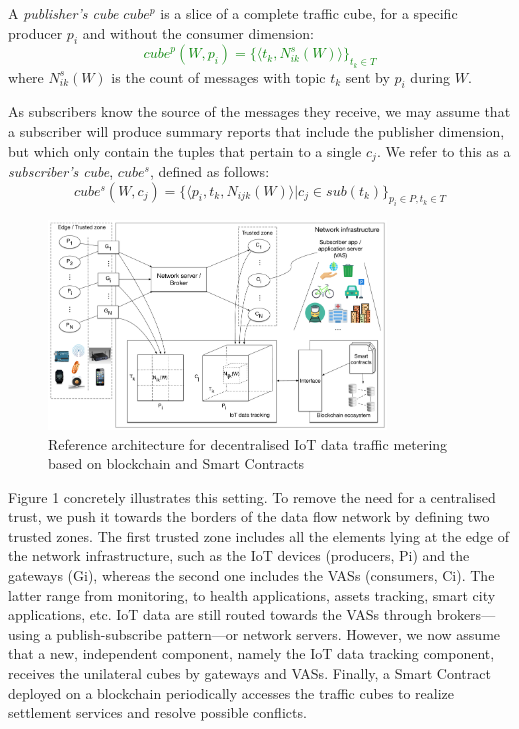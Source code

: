\documentclass[chi_draft]{sigchi}
\begin{document}
A \textit{publisher's cube} $\mathit{cube^p}$ is a slice of a complete traffic cube, for a specific producer $p_i$ and without the consumer dimension:
\textcolor{green}{\[
\mathit{cube}^p(W, p_i)  =  \{ \langle t_k,  N^s_{ik}(W) \rangle \}_{t_k \in T}
\]}
where $N^s_{ik}(W)$ is the count of messages with topic $t_k$ sent by $p_i$ during $W$.

As subscribers know the source of the messages they receive, we may assume that a subscriber will produce summary reports that include the publisher dimension, but which only contain the tuples that pertain to a single $c_j$. We refer to this as a \textit{subscriber's cube}, $ \mathit{cube^s} $, defined as follows:
\[
\mathit{cube^s}(W, c_j)  =  \{ \langle p_i, t_k, N_{ijk}(W) \rangle | c_j \in \mathit{sub}(t_k)\}_{p_i \in P, t_k \in T}
\]

\begin{figure}[!ht]
	\centering
	\includegraphics[width=0.8\textwidth]{figures/IoT-tracking-arch-2}
	\caption{Reference architecture for decentralised IoT data traffic metering based on blockchain and Smart Contracts}
	\label{fig:iot-tracking-arch-2}
\end{figure}

Figure 1 concretely illustrates this setting. To remove the need for a centralised trust, we push it towards the borders of the data flow network by defining two trusted zones. The first trusted zone includes all the elements lying at the edge of the network infrastructure, such as the IoT devices (producers, Pi) and the gateways (Gi), whereas the second one includes the VASs (consumers, Ci). The latter range from   monitoring, to health applications, assets tracking, smart city applications, etc. IoT data are still routed towards the VASs through brokers—using a publish-subscribe pattern—or network servers. However, we now assume that a new, independent component, namely the IoT data tracking component, receives the unilateral cubes by gateways and VASs. Finally, a Smart Contract deployed on a blockchain periodically accesses the traffic cubes to realize settlement services and resolve possible conflicts.
\end{document}
